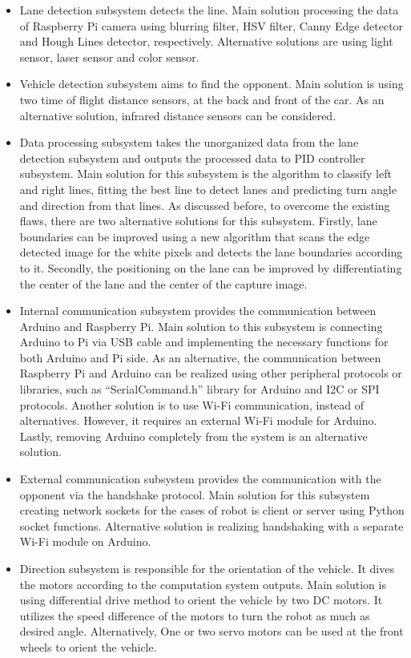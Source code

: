 \documentclass[a4paper,12pt]{article}
\begin{document}
	\begin{itemize}
		
		\item 	Lane detection subsystem detects the line. Main solution processing the data of Raspberry Pi camera using blurring filter, HSV filter, Canny Edge detector and Hough Lines detector, respectively. Alternative solutions are using light sensor, laser sensor and color sensor.
		\item 	Vehicle detection subsystem aims to find the opponent. Main solution is using two time of flight distance sensors, at the back and front of the car. As an alternative solution, infrared distance sensors can be considered.
		\item 	Data processing subsystem takes the unorganized data from the lane detection subsystem and outputs the processed data to PID controller subsystem. Main solution for this subsystem is the algorithm to classify left and right lines, fitting the best line to detect lanes and predicting turn angle and direction from that lines. As discussed before, to overcome the existing flaws, there are two alternative solutions for this subsystem. Firstly, lane boundaries can be improved using a new algorithm that scans the edge detected image for the white pixels and detects the lane boundaries according to it. Secondly, the positioning on the lane can be improved by differentiating the center of the lane and the center of the capture image.
		\item 	Internal communication subsystem provides the communication between Arduino and Raspberry Pi. Main solution to this subsystem is connecting Arduino to Pi via USB cable and implementing the necessary functions for both Arduino and Pi side. As an alternative, the communication between Raspberry Pi and Arduino can be realized using
		other peripheral protocols or libraries, such as “SerialCommand.h” library for Arduino and I2C or SPI protocols. Another solution is to use Wi-Fi communication, instead of alternatives. However, it requires an external Wi-Fi module for Arduino. Lastly, removing Arduino completely from the system is an alternative solution.
		\item 	External communication subsystem provides the communication with the opponent via the handshake protocol. Main solution for this subsystem creating network sockets for the cases of robot is client or server using Python socket functions. Alternative solution is realizing handshaking with a separate Wi-Fi module on Arduino.
		\item 	Direction subsystem is responsible for the orientation of the vehicle. It dives the motors according to the computation system outputs. Main solution is using differential drive method to orient the vehicle by two DC motors. It utilizes the speed difference of the motors to turn the robot as much as desired angle. Alternatively, One or two servo motors can be used at the front wheels to orient the vehicle.
	\end{itemize}
	
\end{document}
